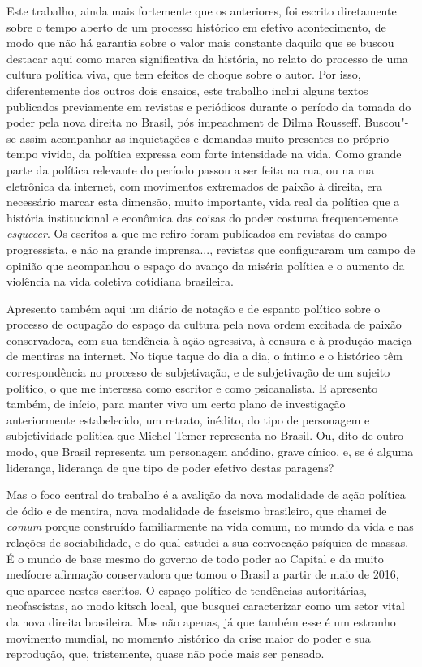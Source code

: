 Este trabalho, ainda mais fortemente que os anteriores, foi escrito
diretamente sobre o tempo aberto de um processo histórico em efetivo
acontecimento, de modo que não há garantia sobre o valor mais constante
daquilo que se buscou destacar aqui como marca significativa da
história, no relato do processo de uma cultura política viva, que tem
efeitos de choque sobre o autor. Por isso, diferentemente dos outros
dois ensaios, este trabalho inclui alguns textos publicados previamente
em revistas e periódicos durante o período da tomada do poder pela nova
direita no Brasil, pós impeachment de Dilma Rousseff. Buscou"-se assim
acompanhar as inquietações e demandas muito presentes no próprio tempo
vivido, da política expressa com forte intensidade na vida. Como grande
parte da política relevante do período passou a ser feita na rua, ou na
rua eletrônica da internet, com movimentos extremados de paixão à
direita, era necessário marcar esta dimensão, muito importante, vida
real da política que a história institucional e econômica das coisas do
poder costuma frequentemente \emph{esquecer}. Os escritos a que me
refiro foram publicados em revistas do campo progressista, e não na
grande imprensa..., revistas que configuraram um campo de opinião que
acompanhou o espaço do avanço da miséria política e o aumento da
violência na vida coletiva cotidiana brasileira.

Apresento também aqui um diário de notação e de espanto político sobre o
processo de ocupação do espaço da cultura pela nova ordem excitada de
paixão conservadora, com sua tendência à ação agressiva, à censura e à
produção maciça de mentiras na internet. No tique taque do dia a dia, o
íntimo e o histórico têm correspondência no processo de subjetivação, e
de subjetivação de um sujeito político, o que me interessa como escritor
e como psicanalista. E apresento também, de início, para manter vivo um
certo plano de investigação anteriormente estabelecido, um retrato,
inédito, do tipo de personagem e subjetividade política que Michel Temer
representa no Brasil. Ou, dito de outro modo, que Brasil representa um personagem
anódino, grave cínico, e, se é alguma liderança, liderança de
que tipo de poder efetivo destas paragens?

Mas o foco central do trabalho é a avalição da nova modalidade de ação
política de ódio e de mentira, nova modalidade de fascismo brasileiro,
que chamei de \emph{comum} porque construído familiarmente na vida
comum, no mundo da vida e nas relações de sociabilidade, e do qual
estudei a sua convocação psíquica de massas. É o mundo de base mesmo do
governo de todo poder ao Capital e da muito medíocre afirmação
conservadora que tomou o Brasil a partir de maio de 2016, que aparece
nestes escritos. O espaço político de tendências autoritárias,
neofascistas, ao modo kitsch local, que busquei caracterizar como um
setor vital da nova direita brasileira. Mas não apenas, já que também
esse é um estranho movimento mundial, no momento histórico da crise
maior do poder e sua reprodução, que, tristemente, quase não pode mais
ser pensado.

